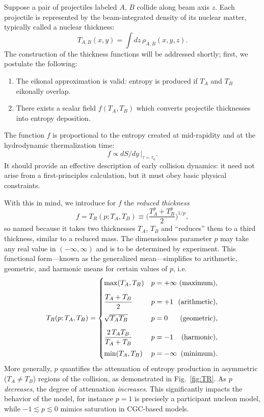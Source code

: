 \documentclass[aps,prc,reprint,amsmath,nofootinbib]{revtex4-1}
\begin{document}
Suppose a pair of projectiles labeled $A$, $B$ collide along beam axis $z$.  Each projectile is represented by
the beam-integrated density of its nuclear matter, typically called a nuclear thickness:
\begin{equation}
  T_{A,B}(x, y) = \int dz \, \rho_{A,B}(x, y, z).
\end{equation}
The construction of the thickness functions will be addressed shortly; first, we postulate the following:
\begin{enumerate}
  \item The eikonal approximation is valid:  entropy is produced if $T_A$ and $T_B$ eikonally overlap.
  \item There exists a scalar field $f(T_A, T_B)$ which converts projectile thicknesses into entropy
    deposition.
\end{enumerate}
The function $f$ is proportional to the entropy created at mid-rapidity and at the hydrodynamic thermalization
time:
\begin{equation}
  f \propto dS/dy \, |_{\tau = \tau_0}.
\end{equation}
It should provide an effective description of early collision dynamics:  it need not arise from a
first-principles calculation, but it must obey basic physical constraints.

With this in mind, we introduce for $f$ the \emph{reduced thickness}
\begin{equation}
  f = T_R(p; T_A, T_B) \equiv \biggl( \frac{T_A^p + T_B^p}{2} \biggr)^{1/p},
  \label{eq:tr}
\end{equation}
so named because it takes two thicknesses $T_A$, $T_B$ and ``reduces'' them to a third thickness, similar to a
reduced mass.  The dimensionless parameter $p$ may take any real value in $(-\infty, \infty)$ and is to be
determined by experiment.  This functional form---known as the generalized mean---simplifies to arithmetic,
geometric, and harmonic means for certain values of $p$, i.e.
\begin{equation}
  T_R(p; T_A, T_B) =
  \begin{cases}
    \max(T_A, T_B) & p = +\infty \hfill \text{ (maximum)}, \\[2ex]
    \dfrac{T_A + T_B}{2} & p = +1 \hfill \text{ (arithmetic)}, \\[2ex]
    \sqrt{T_A T_B} & p = 0 \hfill \text{ (geometric)}, \\[2ex]
    \dfrac{2\, T_A T_B}{T_A + T_B} & p = -1 \hfill \text{ (harmonic)}, \\[2ex]
    \min(T_A, T_B) & p = -\infty \hfill \text{ (minimum)}.
  \end{cases}
\end{equation}
More generally, $p$ quantifies the attenuation of entropy production in asymmetric ($T_A \neq T_B$) regions of
the collision, as demonstrated in Fig.~\ref{fig:TR}.  As $p$ \emph{decreases}, the degree of
attenuation \emph{increases}.  This significantly impacts the behavior of the model, for instance $p=1$ is
precisely a participant nucleon model, while $-1 \lesssim p \lesssim 0$ mimics saturation in CGC-based models.
\end{document}
